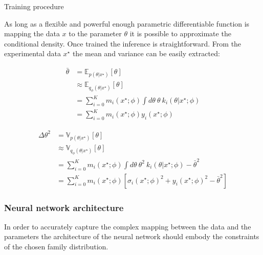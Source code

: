 \begin{algorithm}[H]
 \caption{Training procedure}
\end{algorithm}

As long as a flexible and powerful enough parametric differentiable function is mapping the data $x$ to the parameter $\theta$ it is possible to approximate the conditional density.
Once trained the inference is straightforward.
From the experimental data $x^\star$ the mean and variance can be easily extracted:

\begin{align}
    \bar \theta & = \mathbb E_{p(\theta | x^\star)}[\theta] \\
    & \approx \mathbb E_{q_\phi(\theta | x^\star)}[\theta] \\
    & = \sum_{i=0}^K m_i(x^\star ; \phi) \int d\theta ~ \theta ~ k_i(\theta | x^\star ; \phi) \\
    & = \sum_{i=0}^K m_i(x^\star ; \phi) y_i(x^\star ; \phi)
\end{align}

\begin{align}
    \Delta\theta^2 & = \mathbb V_{p(\theta | x^\star)}[\theta] \\
    & \approx \mathbb V_{q_\phi(\theta | x^\star)}[\theta] \\
    & = \sum_{i=0}^K m_i(x^\star ; \phi) \int d\theta ~ \theta^2 ~ k_i(\theta | x^\star ; \phi) - \bar \theta^2 \\
    & = \sum_{i=0}^K m_i(x^\star ; \phi) \left [ \sigma_i(x^\star ; \phi)^2 + y_i(x^\star ; \phi)^2 - \bar \theta^2 \right ]
\end{align}

\subsubsection{Neural network architecture}

In order to accurately capture the complex mapping between the data and the parameters the architecture of the neural network should embody the constraints of the chosen family distribution.


